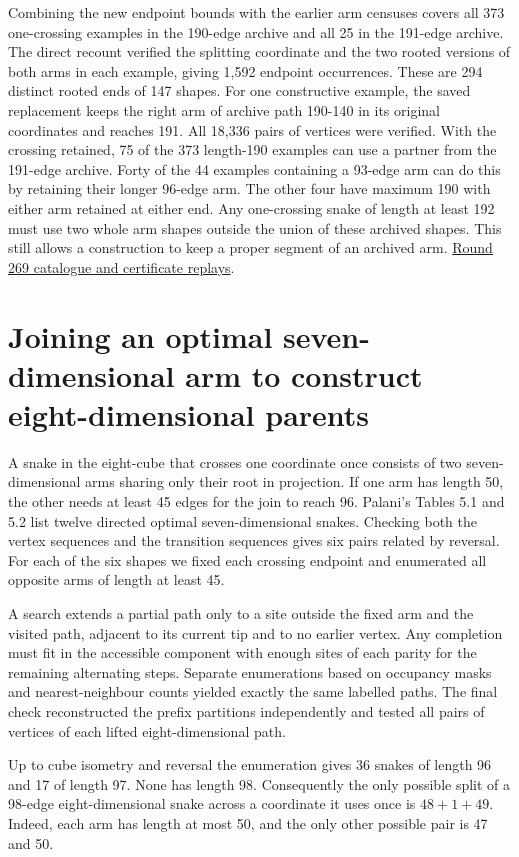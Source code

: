 \documentclass[11pt,a4paper]{article}
\theoremstyle{definition}
\theoremstyle{remark}
\begin{document}
Combining the new endpoint bounds with the earlier arm censuses
covers all 373 one-crossing examples in the 190-edge archive and all
25 in the 191-edge archive. The direct recount verified the splitting
coordinate and the two rooted versions of both arms in each example,
giving 1,592 endpoint occurrences. These are 294 distinct rooted
ends of 147 shapes. For one constructive example, the saved replacement
keeps the right arm of archive path 190-140 in its original coordinates
and reaches 191. All 18,336 pairs of vertices were verified.
With the crossing retained, 75 of the 373 length-190 examples can use
a partner from the 191-edge archive. Forty of the 44 examples containing
a 93-edge arm can do this by retaining their longer 96-edge arm. The
other four have maximum 190 with either arm retained at either end.
Any one-crossing snake of length
at least 192 must use two whole arm shapes outside the union of these
archived shapes. This still allows a construction to keep a proper
segment of an archived arm.
\href{https://github.com/hironaka-iori/Snake-in-the-box-in-9/tree/main/milestones/269-archived-93-arms}{Round 269 catalogue and certificate replays}.

\section{Joining an optimal seven-dimensional arm to construct eight-dimensional parents}
A snake in the eight-cube that crosses one coordinate once consists
of two seven-dimensional arms sharing only their root in projection.
If one arm has length 50, the other needs at least 45 edges for the
join to reach 96. Palani's Tables 5.1 and 5.2 list twelve directed
optimal seven-dimensional snakes. Checking both the vertex sequences
and the transition sequences gives six pairs related by reversal.
For each of the six shapes we fixed each crossing endpoint and
enumerated all opposite arms of length at least 45.

A search extends a partial path only to a site outside the fixed arm
and the visited path, adjacent to its current tip and to no earlier
vertex. Any completion must fit in the accessible component with
enough sites of each parity for the remaining alternating steps.
Separate enumerations based on occupancy masks and nearest-neighbour
counts yielded exactly the same labelled paths. The final check
reconstructed the prefix partitions independently and tested all pairs
of vertices of each lifted eight-dimensional path.

Up to cube isometry and reversal the enumeration gives 36 snakes
of length 96 and 17 of length 97. None has length 98. Consequently
the only possible split of a 98-edge eight-dimensional snake across
a coordinate it uses once is \(48+1+49\). Indeed, each arm has length
at most 50, and the only other possible pair is 47 and 50.
\end{document}
